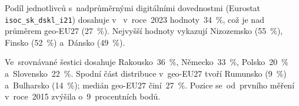 Podíl jednotlivců s~nadprůměrnými digitálními dovednostmi (Eurostat \texttt{isoc\_sk\_dskl\_i21}) dosahuje v~ v~roce~2023 hodnoty~\SI{34}{\percent}, což je nad průměrem \acs{geo-EU27} (\SI{27}{\percent}). Nejvyšší hodnoty vykazují Nizozemsko (\SI{55}{\percent}), Finsko (\SI{52}{\percent}) a~Dánsko (\SI{49}{\percent}).

Ve~srovnávané šestici dosahuje Rakousko~\SI{36}{\percent}, Německo~\SI{33}{\percent}, Polsko~\SI{20}{\percent} a~Slovensko~\SI{22}{\percent}. Spodní část distribuce v~\acs{geo-EU27} tvoří Rumunsko (\SI{9}{\percent}) a~Bulharsko (\SI{14}{\percent}); medián \acs{geo-EU27} činí~\SI{27}{\percent}. Pozice  se~od~prvního měření v~roce~2015 zvýšila o~\SI{9}{}~procentních bodů.


